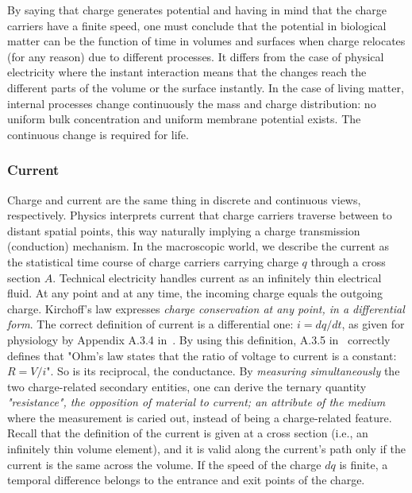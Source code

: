 By saying that charge generates potential and having in mind
that the charge carriers have a finite speed,
one must conclude that
the potential in biological matter can be the function of time 
in volumes and surfaces when charge relocates (for any reason) due to different processes. It differs from the case of physical electricity
where the instant interaction means that the changes
reach the different parts of the volume or the surface instantly. 
In the case of living matter, internal processes change
continuously the mass and charge distribution: no uniform
bulk concentration and uniform membrane potential exists.
The continuous change is required for life. 
 
\subsubsection{Current\label{sec:Physics-Current}}

Charge and current are the same thing in discrete and continuous views, respectively.
Physics interprets current that charge carriers traverse
between to distant spatial points, this way naturally
implying a charge transmission (conduction) mechanism.
In the macroscopic world, we describe the current as the statistical
time course of charge carriers carrying charge $q$ through
a cross section $A$. 
Technical electricity handles current as an infinitely thin 
electrical fluid.
At any point and at any time, the incoming charge equals the outgoing charge.
 Kirchoff's law expresses \textit{charge conservation at any point, in a differential form}.
The correct definition of \hypertarget{electric_current}{current} is a differential one: $i=dq/dt$, as given for physiology by Appendix A.3.4 in~\cite{JohnstonWuNeurophysiology:1995}.
By using this definition, A.3.5 in~\cite{JohnstonWuNeurophysiology:1995} correctly defines that "Ohm's law states that the ratio of voltage to current is a constant:
$R = V/i$". So is its reciprocal, the conductance. By \textit{measuring simultaneously} 
the two charge-related secondary entities, one can derive the ternary quantity \textit{"resistance", the opposition of material to current; an attribute of 
the medium} where the measurement is caried out,
instead of being a charge-related feature.
Recall that the definition of the current is given
at a cross section (i.e., an infinitely thin volume element),
and it is valid along the current's path only if the current
is the same across the volume. If the speed of the
charge $dq$ is finite, a temporal difference belongs
to the entrance and exit points of the charge.

